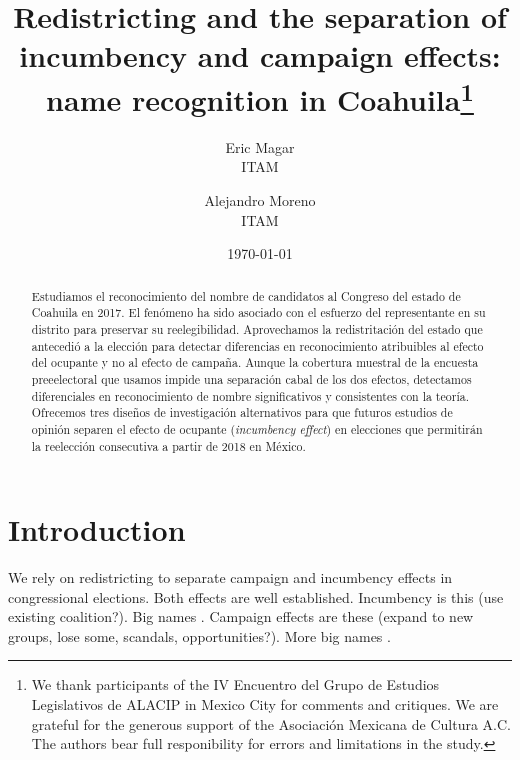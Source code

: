 \documentclass[letter,12pt]{article}
\begin{document}
\title{Redistricting and the separation of incumbency and campaign effects: name recognition in Coahuila\thanks{We thank participants of the IV Encuentro del Grupo de Estudios Legislativos de ALACIP in Mexico City for comments and critiques. We are grateful for the generous support of the Asociación Mexicana de Cultura A.C. The authors bear full responibility for errors and limitations in the study.}}
\author{Eric Magar  \\ ITAM \and
        Alejandro Moreno \\ ITAM 
}
\date{\today}
\maketitle


\begin{abstract}
\noindent Estudiamos el reconocimiento del nombre de candidatos al Congreso del estado de Coahuila en 2017. El fenómeno ha sido asociado con el esfuerzo del representante en su distrito para preservar su reelegibilidad. Aprovechamos la redistritación del estado que antecedió a la elección para detectar diferencias en reconocimiento atribuibles al efecto del ocupante y no al efecto de campaña. Aunque la cobertura muestral de la encuesta preeelectoral que usamos impide una separación cabal de los dos efectos, detectamos diferenciales en reconocimiento de nombre significativos y consistentes con la teoría. Ofrecemos tres diseños de investigación alternativos para que futuros estudios de opinión separen el efecto de ocupante (\emph{incumbency effect}) en elecciones que permitirán la reelección consecutiva a partir de 2018 en México. 
\end{abstract}


\onehalfspacing

\section{Introduction}

We rely on redistricting to separate campaign and incumbency effects in congressional elections. Both effects are well established. Incumbency is this (use existing coalition?). Big names \citep{cain.etal.1987,mayhew1974vanishingMg}. Campaign effects are these (expand to new groups, lose some, scandals, opportunities?). More big names \citep{popkin.1991,moreno.decisElec.2009,downs.1957,sniderman-etal.1991}.
\end{document}
